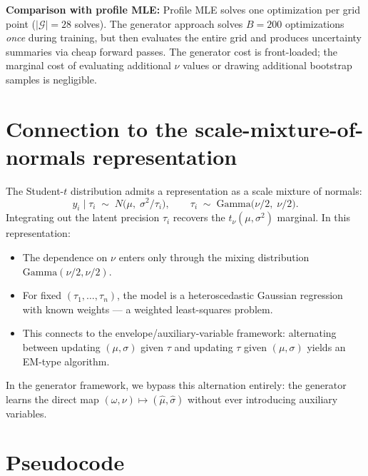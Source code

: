 \documentclass[12pt]{article}
\begin{document}
\textbf{Comparison with profile MLE:}  Profile MLE solves one optimization per grid point ($|\mathcal{G}| = 28$ solves).  The generator approach solves $B=200$ optimizations \emph{once} during training, but then evaluates the entire grid and produces uncertainty summaries via cheap forward passes.  The generator cost is front-loaded; the marginal cost of evaluating additional $\nu$ values or drawing additional bootstrap samples is negligible.

\section{Connection to the scale-mixture-of-normals representation}

The Student-$t$ distribution admits a representation as a scale mixture of normals:
\[
y_i \mid \tau_i \;\sim\; N\!\bigl(\mu,\;\sigma^2/\tau_i\bigr), \qquad \tau_i \;\sim\; \mathrm{Gamma}\!\bigl(\nu/2,\;\nu/2\bigr).
\]
Integrating out the latent precision $\tau_i$ recovers the $t_\nu(\mu,\sigma^2)$ marginal.  In this representation:
\begin{itemize}
\item The dependence on $\nu$ enters only through the mixing distribution $\mathrm{Gamma}(\nu/2,\nu/2)$.
\item For fixed $(\tau_1,\ldots,\tau_n)$, the model is a heteroscedastic Gaussian regression with known weights --- a weighted least-squares problem.
\item This connects to the envelope/auxiliary-variable framework: alternating between updating $(\mu,\sigma)$ given $\tau$ and updating $\tau$ given $(\mu,\sigma)$ yields an EM-type algorithm.
\end{itemize}
In the generator framework, we bypass this alternation entirely: the generator learns the direct map $(\omega,\nu) \mapsto (\hat\mu,\hat\sigma)$ without ever introducing auxiliary variables.

\section{Pseudocode}
\end{document}
